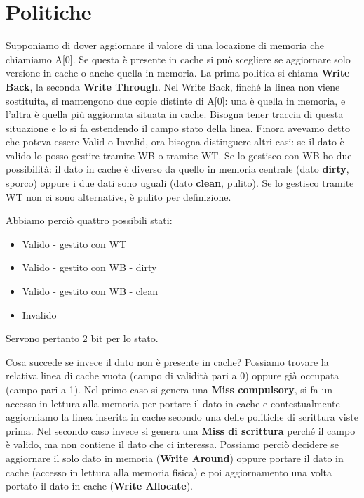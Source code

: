 \documentclass[11pt]{book}
\begin{document}
\section{Politiche}

Supponiamo di dover aggiornare il valore di una locazione di memoria
che chiamiamo A[0]. Se questa \`e presente in cache si pu\`o scegliere
se aggiornare solo versione in cache o anche quella in memoria. La
prima politica si chiama {\bf Write Back}, la seconda {\bf Write
  Through}. Nel Write Back, finch\'e la linea non viene sostituita, si
mantengono due copie distinte di A[0]: una \`e quella in memoria, e
l'altra \`e quella pi\`u aggiornata situata in cache. Bisogna tener
traccia di questa situazione e lo si fa estendendo il campo stato
della linea. Finora avevamo detto che poteva essere Valid o Invalid,
ora bisogna distinguere altri casi: se il dato \`e valido lo posso
gestire tramite WB o tramite WT. Se lo gestisco con WB ho due
possibilit\`a: il dato in cache \`e diverso da quello in memoria
centrale (dato {\bf dirty}, sporco) oppure i due dati sono uguali
(dato {\bf clean}, pulito). Se lo gestisco tramite WT non ci sono
alternative, \`e pulito per definizione.

\par\bigskip

Abbiamo perci\`o quattro possibili stati: 

\begin{itemize}
\item Valido - gestito con WT
\item Valido - gestito con WB - dirty
\item Valido - gestito con WB - clean
\item Invalido
\end{itemize}

Servono pertanto 2 bit per lo stato.

\par\bigskip

Cosa succede se invece il dato non \`e presente in cache? Possiamo
trovare la relativa linea di cache vuota (campo di validit\`a pari a
0) oppure gi\`a occupata (campo pari a 1). Nel primo caso si genera
una {\bf Miss compulsory}, si fa un accesso in lettura alla memoria
per portare il dato in cache e contestualmente aggiorniamo la linea
inserita in cache secondo una delle politiche di scrittura viste
prima. Nel secondo caso invece si genera una {\bf Miss di scrittura}
perch\'e il campo \`e valido, ma non contiene il dato che ci
interessa. Possiamo perci\`o decidere se aggiornare il solo dato in
memoria ({\bf Write Around}) oppure portare il dato in cache (accesso
in lettura alla memoria fisica) e poi aggiornamento una volta portato
il dato in cache ({\bf Write Allocate}).
\end{document}
